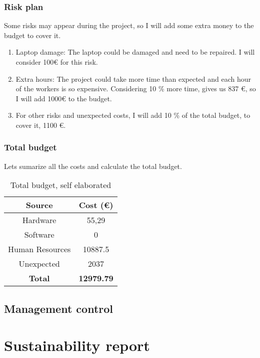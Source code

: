 \subsection*{Risk plan}
Some risks may appear during the project, so I will add some extra money to the budget to cover it.
\begin{enumerate}
    \item Laptop damage: The laptop could be damaged and need to be repaired. I will consider 100€ for this risk.
    \item Extra hours: The project could take more time than expected and each hour of the workers is so expensive. Considering 10 \% more time, gives us 837 €, so I will add 1000€ to the budget.
    \item For other risks and unexpected costs, I will add 10 \% of the total budget, to cover it, 1100 €.
\end{enumerate}
\subsection*{Total budget}
Lets sumarize all the costs and calculate the total budget.
\begin{table}[H]
    \begin{adjustwidth}{-1in}{-1in} %
    \centering
    \begin{tabular}{|c|c|}
    \hline
    \textbf{Source} & \textbf{Cost (€)} \\ 
    \hline
    Hardware &  55,29 \\
    \hline
    Software & 0 \\
    \hline
    Human Resources & 10887.5 \\
    \hline
    Unexpected & 2037 \\
    \hline
    \hline
    \textbf{Total} & \textbf{12979.79}  \\
    \hline
    \end{tabular}
    \caption{Total budget, self elaborated}
    \label{total_budget}
    \end{adjustwidth}
    \end{table}
\section{Management control}

\chapter{Sustainability report}